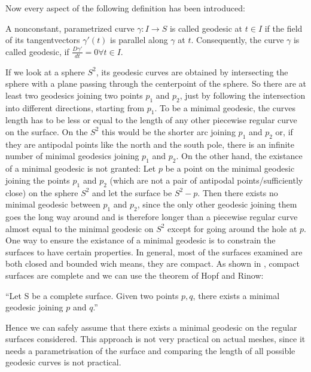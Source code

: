 Now every aspect of the following definition has been introduced:
\begin{mydef}
	A nonconstant, parametrized curve $\gamma: I \rightarrow S$ is called geodesic at $t \in I$ if the field of its tangentvectors $\gamma'(t)$ is parallel along $\gamma$ at $t$.
	Consequently, the curve $\gamma$ is called geodesic, if $\frac{D\gamma'}{dt} = 0 \forall t \in I$.
\end{mydef}
\cite[238-246]{do1976differential}
If we look at a sphere $S^2$, its geodesic curves are obtained by intersecting the sphere with a plane passing through the centerpoint of the sphere.
So there are at least two geodesics joining two points $p_1$ and $p_2$, just by following the intersection into different directions, starting from $p_1$.
To be a minimal geodesic, the curves length has to be less or equal to the length of any other piecewise regular curve on the surface.
On the $S^2$ this would be the shorter arc joining $p_1$ and $p_2$ or, if they are antipodal points like the north and the south pole, there is an infinite number of minimal geodesics joining $p_1$ and $p_2$.
On the other hand, the existance of a minimal geodesic is not granted:
Let $p$ be a point on the minimal geodesic joining the points $p_1$ and $p_2$ (which are not a pair of antipodal points/sufficiently close) on the sphere $S^2$ and let the surface be $S^2-{p}$.
Then there exists no minimal geodesic between $p_1$ and $p_2$, since the only other geodesic joining them goes the long way around and is therefore longer than a piecewise regular curve almost equal to the minimal geodesic on $S^2$ except for going around the hole at $p$.
One way to ensure the existance of a minimal geodesic is to constrain the surfaces to have certain properties.
In general, most of the surfaces examined are both closed and bounded wich means, they are compact.
As shown in \cite[331-332]{do1976differential}, compact surfaces are complete and we can use the theorem of Hopf and Rinow: \\
\begin{theorem}
	``Let S be a complete surface. Given two points $p,q$, there exists a minimal geodesic joining $p$ and $q$.'' \cite[333]{do1976differential} \\
\end{theorem}
Hence we can safely assume that there exists a minimal geodesic on the regular surfaces considered.
This approach is not very practical on actual meshes, since it needs a parametrisation of the surface and comparing the length of all possible geodesic curves is not practical.

